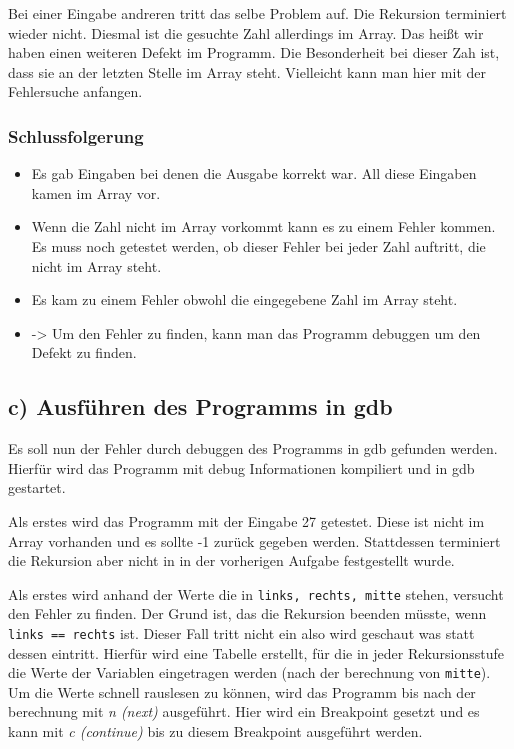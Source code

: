 \documentclass[12pt]{article}
\begin{document}

Bei einer Eingabe andreren tritt das selbe Problem auf. Die Rekursion terminiert wieder nicht. Diesmal ist die gesuchte Zahl allerdings im Array. Das heißt wir haben einen weiteren Defekt im Programm. Die Besonderheit bei dieser Zah ist, dass sie an der letzten Stelle im Array steht. Vielleicht kann man hier mit der Fehlersuche anfangen.

\subsubsection{Schlussfolgerung}

\begin{itemize}
\item Es gab Eingaben bei denen die Ausgabe korrekt war. All diese Eingaben kamen im Array vor.
\item Wenn die Zahl nicht im Array vorkommt kann es zu einem Fehler kommen. Es muss noch getestet werden, ob dieser Fehler bei jeder Zahl auftritt, die nicht im Array steht.
\item Es kam zu einem Fehler obwohl die eingegebene Zahl im Array steht.
\item -> Um den Fehler zu finden, kann man das Programm debuggen um den Defekt zu finden.
\end{itemize}


\subsection{c) Ausführen des Programms in gdb}

Es soll nun der Fehler durch debuggen des Programms in gdb gefunden werden. Hierfür wird das Programm mit debug Informationen kompiliert und in gdb gestartet.


Als erstes wird das Programm mit der Eingabe 27 getestet. Diese ist nicht im Array vorhanden und es sollte -1 zurück gegeben werden. Stattdessen terminiert die Rekursion aber nicht in in der vorherigen Aufgabe festgestellt wurde.


Als erstes wird anhand der Werte die in \texttt{links, rechts, mitte} stehen, versucht den Fehler zu finden. Der Grund ist, das die Rekursion beenden müsste, wenn \texttt{links == rechts} ist. Dieser Fall tritt nicht ein also wird geschaut was statt dessen eintritt. Hierfür wird eine Tabelle erstellt, für die in jeder Rekursionsstufe die Werte der Variablen eingetragen werden (nach der berechnung von \texttt{mitte}).
Um die Werte schnell rauslesen zu können, wird das Programm bis nach der berechnung mit \textit{n (next)} ausgeführt. Hier wird ein Breakpoint gesetzt und es kann mit \textit{c (continue)} bis zu diesem Breakpoint ausgeführt werden. 
\end{document}
